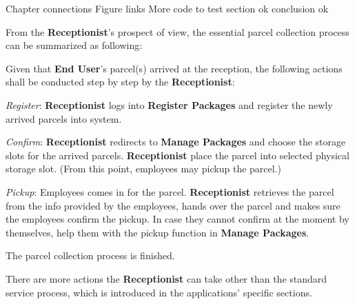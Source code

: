 Chapter connections
Figure links
More code to test section ok
conclusion ok


From the \textbf{Receptionist}'s prospect of view, the essential parcel collection process can be summarized as following:

Given that \textbf{End User}'s parcel(s) arrived at the reception, the following actions shall be conducted step by step by the \textbf{Receptionist}: 

\begin{compactenum}
    \item \textit{Register}: \textbf{Receptionist} logs into \textbf{Register Packages} and register the newly arrived parcels into system.
    \item \textit{Confirm}: \textbf{Receptionist} redirects to \textbf{Manage Packages} and choose the storage slots for the arrived parcels. \textbf{Receptionist} place the parcel into selected physical storage slot. (From this point, employees may pickup the parcel.)
    \item \textit{Pickup}: Employees comes in for the parcel. \textbf{Receptionist} retrieves the parcel from the info provided by the employees, hands over the parcel and makes sure the employees confirm the pickup. In case they cannot confirm at the moment by themselves, help them with the pickup function in \textbf{Manage Packages}.
    \item The parcel collection process is finished.
\end{compactenum}

There are more actions the \textbf{Receptionist} can take other than the standard service process, which is introduced in the applications' specific sections.
